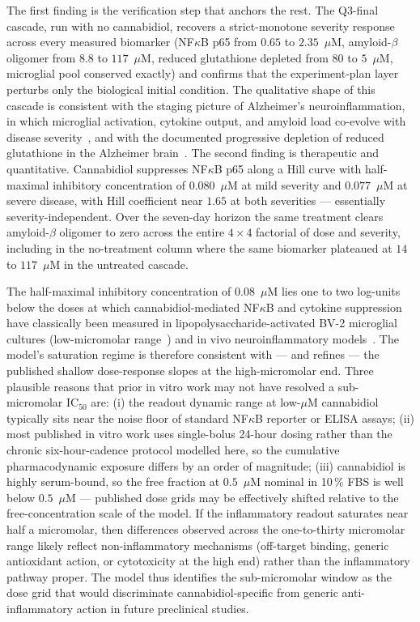 \documentclass[10pt,letterpaper]{article}
\begin{document}
The first finding is the verification step that anchors the rest. The Q3-final cascade, run with no cannabidiol, recovers a strict-monotone severity response across every measured biomarker (NF$\kappa$B p65 from $0.65$ to $2.35$~$\mu$M, amyloid-$\beta$ oligomer from $8.8$ to $117$~$\mu$M, reduced glutathione depleted from $80$ to $5$~$\mu$M, microglial pool conserved exactly) and confirms that the experiment-plan layer perturbs only the biological initial condition. The qualitative shape of this cascade is consistent with the staging picture of Alzheimer's neuroinflammation, in which microglial activation, cytokine output, and amyloid load co-evolve with disease severity~\cite{heneka2015,ransohoff2016}, and with the documented progressive depletion of reduced glutathione in the Alzheimer brain~\cite{cassano2020,watt2017}. The second finding is therapeutic and quantitative. Cannabidiol suppresses NF$\kappa$B p65 along a Hill curve with half-maximal inhibitory concentration of $0.080$~$\mu$M at mild severity and $0.077$~$\mu$M at severe disease, with Hill coefficient near $1.65$ at both severities --- essentially severity-independent. Over the seven-day horizon the same treatment clears amyloid-$\beta$ oligomer to zero across the entire $4 \times 4$ factorial of dose and severity, including in the no-treatment column where the same biomarker plateaued at $14$ to $117$~$\mu$M in the untreated cascade.

The half-maximal inhibitory concentration of $0.08$~$\mu$M lies one to two log-units below the doses at which cannabidiol-mediated NF$\kappa$B and cytokine suppression have classically been measured in lipopolysaccharide-activated BV-2 microglial cultures (low-micromolar range~\cite{kozela2010,juknat2013}) and in vivo neuroinflammatory models~\cite{esposito2011,martinmoreno2011}. The model's saturation regime is therefore consistent with --- and refines --- the published shallow dose-response slopes at the high-micromolar end. Three plausible reasons that prior in vitro work may not have resolved a sub-micromolar IC$_{50}$ are: (i) the readout dynamic range at low-$\mu$M cannabidiol typically sits near the noise floor of standard NF$\kappa$B reporter or ELISA assays; (ii) most published in vitro work uses single-bolus 24-hour dosing rather than the chronic six-hour-cadence protocol modelled here, so the cumulative pharmacodynamic exposure differs by an order of magnitude; (iii) cannabidiol is highly serum-bound, so the free fraction at $0.5$~$\mu$M nominal in 10\,\% FBS is well below $0.5$~$\mu$M --- published dose grids may be effectively shifted relative to the free-concentration scale of the model. If the inflammatory readout saturates near half a micromolar, then differences observed across the one-to-thirty micromolar range likely reflect non-inflammatory mechanisms (off-target binding, generic antioxidant action, or cytotoxicity at the high end) rather than the inflammatory pathway proper. The model thus identifies the sub-micromolar window as the dose grid that would discriminate cannabidiol-specific from generic anti-inflammatory action in future preclinical studies.
\end{document}

